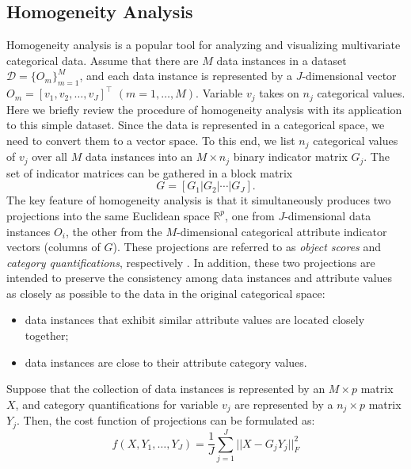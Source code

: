 \documentclass[a4paper]{article}
\begin{document}
\subsection{Homogeneity Analysis}
\label{subsec:HA}
Homogeneity analysis \cite{gifi} is a popular tool for analyzing and visualizing multivariate categorical data.  
Assume that there are $M$ data instances in a dataset $\mathcal{D}=\{O_m\}_{m=1}^M$, and each data instance is  
represented by a $J$-dimensional vector $O_m=[v_1,v_2,\dots, v_J]^\top$ $(m = 1,\dots,M)$. 
Variable $v_j$ takes on $n_j$ categorical values. Here we briefly review the procedure of homogeneity analysis with its 
application to this simple dataset. 
Since the data is represented in a categorical space, 
we need to convert them to a vector space.    
To this end, we list $n_j$ categorical values of $v_j$ over all $M$ data instances into an $M\times n_j$ binary indicator matrix $G_j$.  The set of indicator matrices 
can be gathered in a block matrix
\begin{equation}
  G=[G_1 | G_2 | \cdots | G_J].
\end{equation}
The key feature of homogeneity analysis is that it simultaneously
produces two projections into the same Euclidean space $\mathbb{R}^p$,
one from $J$-dimensional data instances $O_i$, the other from the
$M$-dimensional categorical attribute indicator vectors (columns of
$G$).  These projections are referred to as \emph{object 
scores} and \emph{category quantifications}, respectively \cite{gifi}. 
In addition, these two projections are intended to preserve the consistency among data instances and 
attribute values as closely as possible to the data in the original categorical space:
\begin{itemize}
    \item data instances that exhibit similar attribute values are located closely together; 
    \item data instances are close to their attribute category values.
\end{itemize}
Suppose that the collection of data instances is represented by an $M\times p$ matrix $X$, and category quantifications for variable $v_j$ are represented by 
a $n_j\times p$ matrix $Y_j$. Then, the cost function of projections can be formulated as:
\begin{equation} 
    f(X,Y_1,\ldots, Y_J)=\frac{1}{J} \sum_{j=1}^{J} ||X-G_j Y_j||_F^2 
  \label{equ:cost_function}
\end{equation}
\end{document}
